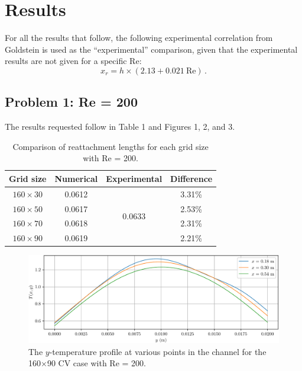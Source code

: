 \documentclass{article}
\begin{document}
\section{Results}

For all the results that follow, the following experimental correlation from Goldstein is used as the ``experimental'' comparison, given that the experimental results are not given for a specific Re:
\[
	x_r = h \times (2.13 + 0.021~\text{Re})\,.
\]

\subsection{Problem 1: Re = 200}

The results requested follow in Table 1 and Figures 1, 2, and 3.

\def\arraystretch{1.3}
\begin{table}[H]
	\small
	\centering
	\caption{Comparison of reattachment lengths for each grid size with Re = 200.}
	\vspace{0.2cm}
	\begin{tabular}{c|c|c|c}
		Grid size & Numerical & Experimental & Difference \\
		\hline
		$160\times30$ & 0.0612 & \multirow{4}{*}{0.0633} & 3.31\% \\
		$160\times50$ & 0.0617 & & 2.53\% \\
		$160\times70$ & 0.0618 & & 2.31\% \\
		$160\times90$ & 0.0619 & & 2.21\% \\
	\end{tabular}
	\label{table:b-temps}
\end{table}

\begin{figure}[H]
	\centering
	\includegraphics[width=0.9\linewidth]{../results/1a_Ty}
	\caption{The $y$-temperature profile at various points in the channel for the 160$\times$90 CV case with Re = 200.}
	\label{fig:1a_Ty}
\end{figure}
\end{document}
